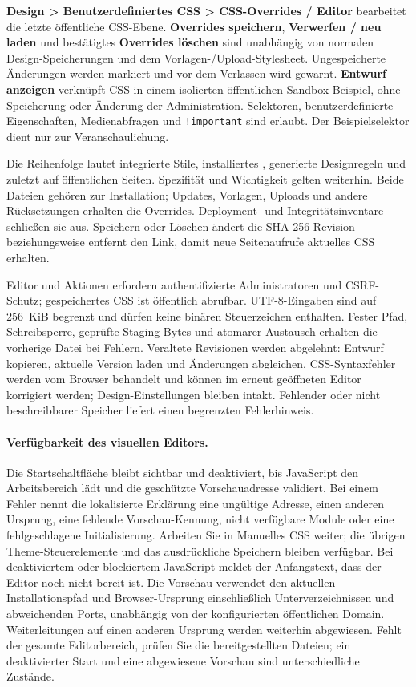 \documentclass[11pt,a4paper]{article}
\newcommand{\filepath}[1]{\path{#1}}
\newcommand{\ui}[1]{\textbf{#1}}
\newcommand{\codeword}[1]{\nolinkurl{#1}}
\begin{document}
\ui{Design > Benutzerdefiniertes CSS > CSS-Overrides / Editor} bearbeitet die
letzte öffentliche CSS-Ebene. \ui{Overrides speichern}, \ui{Verwerfen / neu
laden} und bestätigtes \ui{Overrides löschen} sind unabhängig von normalen
Design-Speicherungen und dem Vorlagen-/Upload-Stylesheet. Ungespeicherte
Änderungen werden markiert und vor dem Verlassen wird gewarnt. \ui{Entwurf
anzeigen} verknüpft CSS in einem isolierten öffentlichen Sandbox-Beispiel, ohne
Speicherung oder Änderung der Administration. Selektoren, benutzerdefinierte
Eigenschaften, Medienabfragen und \codeword{!important} sind erlaubt. Der
Beispielselektor dient nur zur Veranschaulichung.

Die Reihenfolge lautet integrierte Stile, installiertes
\filepath{public/assets/custom.css}, generierte Designregeln und zuletzt
\filepath{public/assets/custom-overrides.css} auf öffentlichen Seiten.
Spezifität und Wichtigkeit gelten weiterhin. Beide Dateien gehören zur
Installation; Updates, Vorlagen, Uploads und andere Rücksetzungen erhalten die
Overrides. Deployment- und Integritätsinventare schließen sie aus. Speichern
oder Löschen ändert die SHA-256-Revision beziehungsweise entfernt den Link,
damit neue Seitenaufrufe aktuelles CSS erhalten.

Editor und Aktionen erfordern authentifizierte Administratoren und CSRF-Schutz;
gespeichertes CSS ist öffentlich abrufbar. UTF-8-Eingaben sind auf 256~KiB
begrenzt und dürfen keine binären Steuerzeichen enthalten. Fester Pfad,
Schreibsperre, geprüfte Staging-Bytes und atomarer Austausch erhalten die
vorherige Datei bei Fehlern. Veraltete Revisionen werden abgelehnt: Entwurf
kopieren, aktuelle Version laden und Änderungen abgleichen. CSS-Syntaxfehler
werden vom Browser behandelt und können im erneut geöffneten Editor korrigiert
werden; Design-Einstellungen bleiben intakt. Fehlender oder nicht beschreibbarer
Speicher liefert einen begrenzten Fehlerhinweis.

\paragraph{Verfügbarkeit des visuellen Editors.} Die Startschaltfläche bleibt
sichtbar und deaktiviert, bis JavaScript den Arbeitsbereich lädt und die
geschützte Vorschauadresse validiert. Bei einem Fehler nennt die lokalisierte
Erklärung eine ungültige Adresse, einen anderen Ursprung, eine fehlende
Vorschau-Kennung, nicht verfügbare Module oder eine fehlgeschlagene
Initialisierung. Arbeiten Sie in Manuelles CSS weiter; die übrigen
Theme-Steuerelemente und das ausdrückliche Speichern bleiben verfügbar. Bei
deaktiviertem oder blockiertem JavaScript meldet der Anfangstext, dass der
Editor noch nicht bereit ist. Die Vorschau verwendet den aktuellen
Installationspfad und Browser-Ursprung einschließlich Unterverzeichnissen und
abweichenden Ports, unabhängig von der konfigurierten öffentlichen Domain.
Weiterleitungen auf einen anderen Ursprung werden weiterhin abgewiesen. Fehlt
der gesamte Editorbereich, prüfen Sie die bereitgestellten Dateien; ein
deaktivierter Start und eine abgewiesene Vorschau sind unterschiedliche
Zustände.
\end{document}
